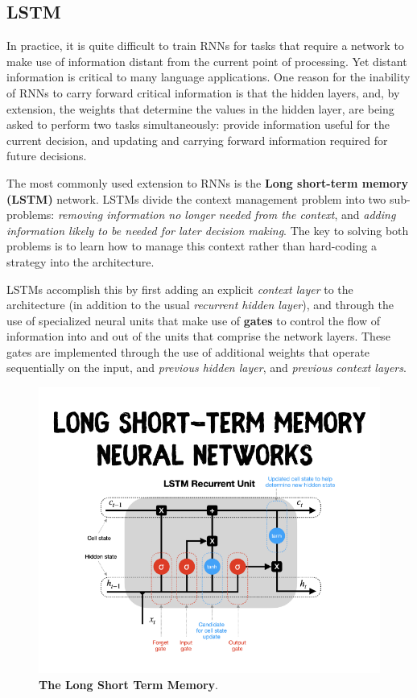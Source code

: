 \documentclass[11pt]{article}
\begin{document}
\subsection{LSTM}
In practice, it is quite difficult to train RNNs for tasks that require a network to make use of information distant from the current point of processing. Yet distant information is critical to many language applications.  One reason for the inability of RNNs to carry forward critical information is that the hidden layers, and, by extension, the weights that determine the values in the hidden layer, are being asked to perform two tasks simultaneously: provide information useful for the current decision, and updating and carrying forward information required for future decisions.

The most commonly used extension to RNNs is the \textbf{Long short-term memory (LSTM)} network. LSTMs divide the context management problem into two sub-problems: \emph{removing information no longer needed from the context}, and \emph{adding information likely to be needed for later decision making}. The key to solving both problems is to learn how to manage this context rather than hard-coding a strategy into the architecture. 

LSTMs accomplish this by first adding an explicit \emph{context layer} to the architecture (in addition to the usual \emph{recurrent hidden layer}), and through the use of specialized neural units that make use of \textbf{gates} to control the flow of information into and out of the units that comprise the network layers. These gates are implemented through the use of additional weights that operate sequentially on the input, and \emph{previous hidden layer}, and \emph{previous context layers}.

\begin{figure}
\begin{minipage}[t]{1\linewidth}
  \centering
  \centerline{\includegraphics[scale = 0.5]{LSTM.png}}
\end{minipage}
\caption{\footnotesize{\textbf{The Long Short Term Memory}.}}
\label{fig: lstm}
\end{figure}
\end{document}

